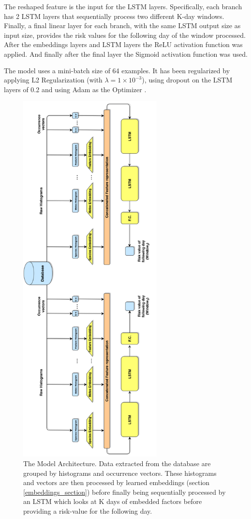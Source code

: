 The reshaped feature is the input for the LSTM layers. Specifically, each branch has 2 LSTM layers that sequentially process two different K-day windows. Finally, a final linear layer for each branch, with the same LSTM output size as input size, provides the risk values for the following day of the window processed.
After the embeddings layers and LSTM layers the ReLU \cite{relu} activation function was applied. And finally after the final layer the Sigmoid \cite{sigmoid} activation function was used.

The model uses a mini-batch size of 64 examples. It has been regularized by applying L2 Regularization \cite{ng2004feature} (with $\lambda = 1\times10^{-3}$), using dropout \cite{srivastava2014dropout} on the LSTM layers of 0.2 and using Adam as the Optimizer \cite{adam}.

\begin{figure}
	\centering
	\includegraphics[width=7.3cm]{img/network2.pdf}
	\caption{The Model Architecture. Data extracted from the database are grouped by histograms and occurrence vectors. These histograms and vectors are then processed by learned embeddings (section \ref{embeddings_section}) before finally being sequentially processed by an LSTM which looks at K days of embedded factors before providing a risk-value for the following day.}
	\label{architecture}
\end{figure}

